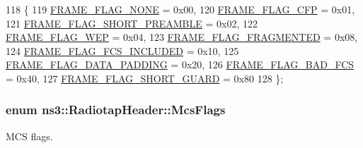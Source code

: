 \begin{DoxyCode}
118   \{
119     \hyperlink{classns3_1_1RadiotapHeader_a4375e57b5815a2ac2d6cfe4ca0c703d4ac603854554c27b36d25257eafa37b896}{FRAME\_FLAG\_NONE}           = 0x00, 
120     \hyperlink{classns3_1_1RadiotapHeader_a4375e57b5815a2ac2d6cfe4ca0c703d4a70335c3bfdf5ec24f8be46d4c16d1e6a}{FRAME\_FLAG\_CFP}            = 0x01, 
121     \hyperlink{classns3_1_1RadiotapHeader_a4375e57b5815a2ac2d6cfe4ca0c703d4a654ebb50af85aaaee342f7939782efd1}{FRAME\_FLAG\_SHORT\_PREAMBLE} = 0x02, 
122     \hyperlink{classns3_1_1RadiotapHeader_a4375e57b5815a2ac2d6cfe4ca0c703d4a76712088760e63434a5cdcdaefd5836c}{FRAME\_FLAG\_WEP}            = 0x04, 
123     \hyperlink{classns3_1_1RadiotapHeader_a4375e57b5815a2ac2d6cfe4ca0c703d4a016af74bb12effca576c410dc0a12aa0}{FRAME\_FLAG\_FRAGMENTED}     = 0x08, 
124     \hyperlink{classns3_1_1RadiotapHeader_a4375e57b5815a2ac2d6cfe4ca0c703d4abe8c5f484aba9e96a66a47cdf75324db}{FRAME\_FLAG\_FCS\_INCLUDED}   = 0x10, 
125     \hyperlink{classns3_1_1RadiotapHeader_a4375e57b5815a2ac2d6cfe4ca0c703d4aa5e58dc045e024290bcf1bc1ab70ce1e}{FRAME\_FLAG\_DATA\_PADDING}   = 0x20, 
126     \hyperlink{classns3_1_1RadiotapHeader_a4375e57b5815a2ac2d6cfe4ca0c703d4a056df6170656cc4856529f7ad99a8c88}{FRAME\_FLAG\_BAD\_FCS}        = 0x40, 
127     \hyperlink{classns3_1_1RadiotapHeader_a4375e57b5815a2ac2d6cfe4ca0c703d4a6656cb9084d29627022e94f04a1f0e0c}{FRAME\_FLAG\_SHORT\_GUARD}    = 0x80  
128   \};
\end{DoxyCode}
\subsubsection[{\texorpdfstring{Mcs\+Flags}{McsFlags}}]{\setlength{\rightskip}{0pt plus 5cm}enum {\bf ns3\+::\+Radiotap\+Header\+::\+Mcs\+Flags}}\hypertarget{classns3_1_1RadiotapHeader_a81a58a7c4281df7ce21fb72c5ed181c3}{}\label{classns3_1_1RadiotapHeader_a81a58a7c4281df7ce21fb72c5ed181c3}


M\+CS flags. 

